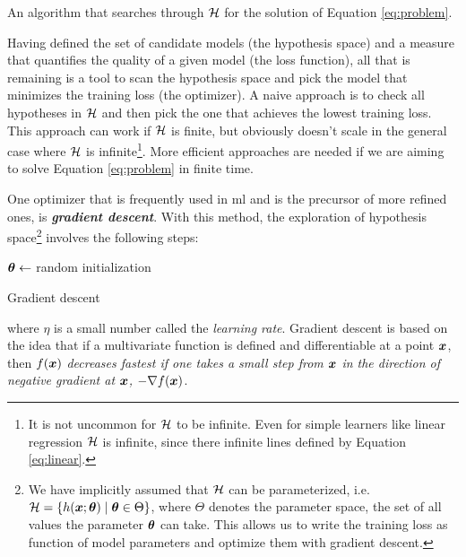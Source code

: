 \begin{definition}[Optimizer]
	An algorithm that searches through $\mathcal{H}$ for the solution of Equation
	\ref{eq:problem}.
\end{definition}

Having defined the set of candidate models (the hypothesis space) and a measure
that quantifies the quality of a given model (the loss function), all that is
remaining is a tool to scan the hypothesis space and pick the model that
minimizes the training loss (the optimizer). A naive approach is to check all
hypotheses in $\mathcal{H}$ and then pick the one that achieves the lowest training
loss. This approach can work if $\mathcal{H}$ is finite, but obviously doesn't scale
in the general case where $\mathcal{H}$ is infinite\footnote{It is not
uncommon for $\mathcal{H}$ to be infinite. Even for simple learners like linear
regression $\mathcal{H}$ is infinite, since there infinite lines defined by Equation
\ref{eq:linear}.}. More efficient approaches are needed if we are aiming to solve
Equation \ref{eq:problem} in finite time.

One optimizer that is frequently used in \gls{ml} and is the precursor of more
refined ones, is \emph{\textbf{gradient descent}}. With
this method, the exploration of hypothesis space\footnote{We have implicitly
assumed that $\mathcal{H}$ can be parameterized, i.e. $\mathcal{H} = \{h(\boldsymbol{x};\boldsymbol{\theta})
\mid \boldsymbol{\theta} \in \Theta\}$, where $\Theta$ denotes the parameter space, the set of
all values the parameter $\boldsymbol{\theta}$ can take. This allows us to write the training
loss as function of model parameters and optimize them with gradient descent.}
involves the following steps:

\begin{algorithm}[H]
	$\boldsymbol{\theta} \gets$ random initialization\;
	\caption{Gradient descent}
	\label{algo:gd}
\end{algorithm}

\noindent where $\eta$ is a small number called the \emph{learning
rate}. Gradient descent is based on the idea that
if a multivariate function is defined and differentiable at a point $\boldsymbol{x}$, then
$f(\boldsymbol{x})$ \emph{decreases fastest if one takes a small step from $\boldsymbol{x}$ in the
direction of negative gradient at $\boldsymbol{x}$, $-\nabla f(\boldsymbol{x})$}.

